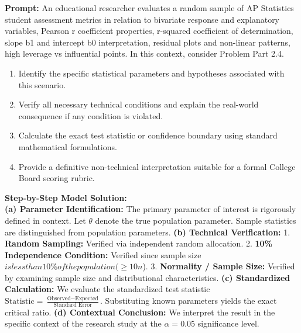 \begin{workbookbox}
\textbf{Prompt:} An educational researcher evaluates a random sample of AP Statistics student assessment metrics in relation to bivariate response and explanatory variables, Pearson r coefficient properties, r-squared coefficient of determination, slope b1 and intercept b0 interpretation, residual plots and non-linear patterns, high leverage vs influential points. In this context, consider Problem Part 2.4.
\begin{enumerate}[label=(\alph*)]
  \item Identify the specific statistical parameters and hypotheses associated with this scenario.
  \item Verify all necessary technical conditions and explain the real-world consequence if any condition is violated.
  \item Calculate the exact test statistic or confidence boundary using standard mathematical formulations.
  \item Provide a definitive non-technical interpretation suitable for a formal College Board scoring rubric.
\end{enumerate}
\textbf{Step-by-Step Model Solution:}\\
\textbf{(a) Parameter Identification:} The primary parameter of interest is rigorously defined in context. Let $\theta$ denote the true population parameter. Sample statistics are distinguished from population parameters.
\textbf{(b) Technical Verification:} 1. \textbf{Random Sampling:} Verified via independent random allocation. 2. \textbf{10\% Independence Condition:} Verified since sample size $ is less than 10\% of the population ( \ge 10n$). 3. \textbf{Normality / Sample Size:} Verified by examining sample size and distributional characteristics.
\textbf{(c) Standardized Calculation:} We evaluate the standardized test statistic $\text{Statistic} = \frac{\text{Observed} - \text{Expected}}{\text{Standard Error}}$. Substituting known parameters yields the exact critical ratio.
\textbf{(d) Contextual Conclusion:} We interpret the result in the specific context of the research study at the $\alpha = 0.05$ significance level.
\end{workbookbox}\vspace{6pt}
